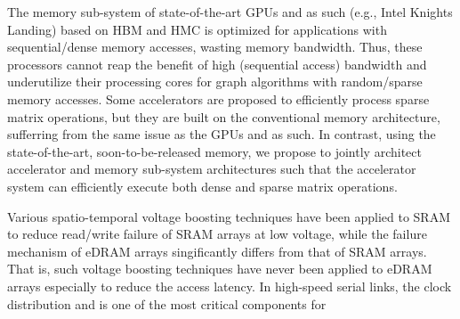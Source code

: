 \noindent
The memory sub-system of state-of-the-art GPUs and as such (e.g., Intel Knights Landing) based on HBM and HMC is optimized for applications with sequential/dense memory accesses, wasting memory bandwidth.
Thus, these processors cannot reap the benefit of high (sequential access) bandwidth and underutilize their processing cores for graph algorithms with random/sparse memory accesses.
Some accelerators are proposed to efficiently process sparse matrix operations, but they are built on the conventional memory architecture, sufferring from the same issue as the GPUs and as such.
In contrast, using the state-of-the-art, soon-to-be-released memory, we propose to jointly architect accelerator and memory sub-system architectures 
such that the accelerator system can efficiently execute both dense and sparse matrix operations.

Various spatio-temporal voltage boosting techniques have been applied to SRAM to reduce read/write failure of SRAM arrays at low voltage, while the failure mechanism of eDRAM arrays singificantly differs from that of SRAM arrays.
That is, such voltage boosting techniques have never been applied to eDRAM arrays especially to reduce the access latency.
In high-speed serial links, the clock distribution and is one of the most critical components for


